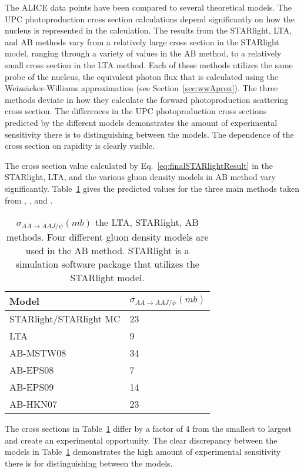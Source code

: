     The ALICE data points have been compared to several theoretical models. 
  The UPC photoproduction cross section calculations depend significantly on 
    how the nucleus is represented in the calculation. 
  The results from the STARlight, LTA, and AB methods vary from a relatively 
    large cross section in the STARlight model, ranging through a variety of values
    in the AB method, to a relatively small cross section in the LTA method. 
  Each of these methods utilizes the same probe of the nucleus, the equivalent 
    photon flux that is calculated using the Weizs\"{a}cker-Williams approximation 
    (see Section~\ref{sec:wwAprox}). 
  The three methods deviate in how they calculate the forward photoproduction
    scattering cross section.
  The differences in the UPC photoproduction cross sections predicted by the 
    different models demonstrates the amount of experimental sensitivity there 
    is to distinguishing between the models. 
  The dependence of the cross section on rapidity is clearly visible.   

  The cross section value calculated by Eq.~\ref{eq:finalSTARlightResult} in the 
    STARlight, LTA, and the various gluon density models in AB method vary 
    significantly.
  Table~\ref{tab:allXsec} gives the predicted values for the three main methods
    taken from \cite{pQCD2013.02}, \cite{lta2011.09}, and \cite{vmd1999}.
  \begin{table} 
   \centering
   \begin{tabular}{|l|l|} 
     \hline
     Model & $\sigma_{AA\rightarrow AAJ/\psi} (mb)$ \\ \hline \hline
     STARlight/STARlight MC & 23 \\ \hline
     LTA & 9 \\ \hline
     AB-MSTW08 & 34 \\ \hline
     AB-EPS08 & 7  \\ \hline
     AB-EPS09 & 14 \\ \hline
     AB-HKN07 & 23 \\ \hline
     \hline
   \end{tabular}
   \caption{$\sigma_{AA\rightarrow AAJ/\psi} (mb)$
    the LTA, STARlight, AB methods. Four different gluon density models are used 
    in the AB method. STARlight is a simulation software package that utilizes 
    the STARlight model.}
   \label{tab:allXsec}
  \end{table}
  The cross sections in Table~\ref{tab:allXsec} differ by a factor of 4 
    from the smallest to largest and create an experimental opportunity. 
  The clear discrepancy between the models in Table~\ref{tab:allXsec} 
    demonstrates the high amount of experimental sensitivity there is for 
    distinguishing between the models. 

